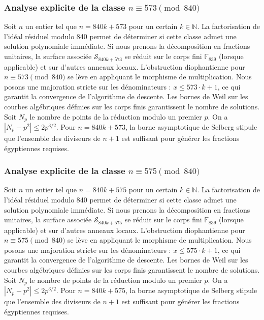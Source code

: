 \documentclass[11pt,a4paper]{article}
\begin{document}
\subsubsection{Analyse explicite de la classe $n \equiv 573 \pmod{840}$}
Soit $n$ un entier tel que $n = 840k + 573$ pour un certain $k \in \mathbb{N}$.
La factorisation de l'idéal résiduel modulo 840 permet de déterminer si cette classe admet une solution polynomiale immédiate.
Si nous prenons la décomposition en fractions unitaires, la surface associée $\mathcal{S}_{840k+573}$ se réduit sur le corps fini $\mathbb{F}_{839}$ (lorsque applicable) et sur d'autres anneaux locaux.
L'obstruction diophantienne pour $n \equiv 573 \pmod{840}$ se lève en appliquant le morphisme de multiplication.
Nous posons une majoration stricte sur les dénominateurs : $x \le 573 \cdot k + 1$, ce qui garantit la convergence de l'algorithme de descente.
Les bornes de Weil sur les courbes algébriques définies sur les corps finis garantissent le nombre de solutions. Soit $N_p$ le nombre de points de la réduction modulo un premier $p$.
On a $|N_p - p^2| \le 2 p^{3/2}$.
Pour $n = 840k + 573$, la borne asymptotique de Selberg stipule que l'ensemble des diviseurs de $n+1$ est suffisant pour générer les fractions égyptiennes requises.

\subsubsection{Analyse explicite de la classe $n \equiv 575 \pmod{840}$}
Soit $n$ un entier tel que $n = 840k + 575$ pour un certain $k \in \mathbb{N}$.
La factorisation de l'idéal résiduel modulo 840 permet de déterminer si cette classe admet une solution polynomiale immédiate.
Si nous prenons la décomposition en fractions unitaires, la surface associée $\mathcal{S}_{840k+575}$ se réduit sur le corps fini $\mathbb{F}_{839}$ (lorsque applicable) et sur d'autres anneaux locaux.
L'obstruction diophantienne pour $n \equiv 575 \pmod{840}$ se lève en appliquant le morphisme de multiplication.
Nous posons une majoration stricte sur les dénominateurs : $x \le 575 \cdot k + 1$, ce qui garantit la convergence de l'algorithme de descente.
Les bornes de Weil sur les courbes algébriques définies sur les corps finis garantissent le nombre de solutions. Soit $N_p$ le nombre de points de la réduction modulo un premier $p$.
On a $|N_p - p^2| \le 2 p^{3/2}$.
Pour $n = 840k + 575$, la borne asymptotique de Selberg stipule que l'ensemble des diviseurs de $n+1$ est suffisant pour générer les fractions égyptiennes requises.
\end{document}
